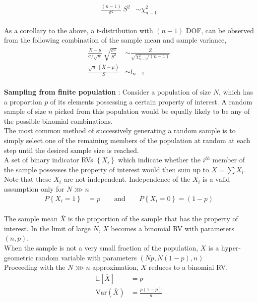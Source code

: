 \begin{align}
	\frac{(n-1)}{\sigma^2}\ S^2 &\sim \chi^2_{n-1}
\end{align}\\

As a corollary to the above, a t-distribution with $ (n-1) $ DOF, can be observed from the following combination of the sample mean and sample variance, \\

\begin{align}
	\frac{\overline{X}- \mu}{\sigma / \sqrt{n}}\ \sqrt{\frac{\sigma^2}{S^2}} &\sim \frac{Z}{\sqrt{\chi^2_{n-1} / (n-1)}} \nonumber \\
	\frac{\sqrt{n}\ (\overline{X}- \mu)}{S} &\sim t_{n-1}
\end{align}\\

\textbf{Sampling from finite population} : Consider a population of size $ N $, which has a proportion $ p $ of its elements possessing a certain property of interest. A random sample of size $ n $ picked from this population would be equally likely to be any of the possible binomial combinations.\\

The most common method of successively generating a random sample is to simply select one of the remaining members of the population at random at each step until the desired sample size is reached. \\

A set of binary indicator RVs $ \left\{X_i\right\} $ which indicate whether the $ i^{th} $ member of the sample possesses the property of interest would then sum up to $ X = \sum X_i $. Note that these $ X_i $ are not independent. Independence of the $ X_i $ is a valid assumption only for $ N \ggg n $\\

\begin{align}
	P\left\{X_i = 1\right\} &= p \qquad \text{and} \qquad P\left\{X_i = 0\right\} = (1-p)
\end{align}\\

The sample mean $ \overline{X} $ is the proportion of the sample that has the property of interest. In the limit of large $ N $, $ X $ becomes a binomial RV with parameters $ (n, p) $.\\

When the sample is not a very small fraction of the population, $ X $ is a hyper-geometric random variable with parameters $ (Np, N(1-p), n) $\\

Proceeding with the $ N \ggg n $ approximation, $ X $ reduces to a binomial RV. \\

\begin{align}
	\mathbb{E}[\overline{X}] &= p \\
	\mathrm{Var}(\overline{X}) &= \frac{p(1-p)}{n}
\end{align}

